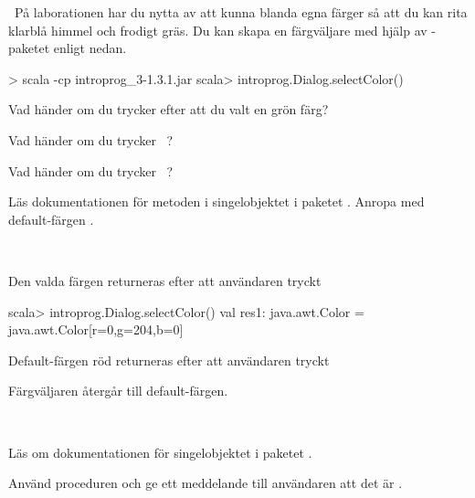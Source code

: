\Task \what~På laborationen har du nytta av att kunna blanda egna färger så att du kan rita klarblå himmel och frodigt gräs. Du kan skapa en färgväljare med hjälp av -paketet enligt nedan.
\begin{REPL}
> scala -cp introprog_3-1.3.1.jar
scala> introprog.Dialog.selectColor()
\end{REPL}

\Subtask Vad händer om du trycker  efter att du valt en grön färg?

\Subtask Vad händer om du trycker ~?

\Subtask Vad händer om du trycker ~?

\Subtask Läs  dokumentationen för metoden  i singelobjektet  i paketet . Anropa  med default-färgen .

\SOLUTION

\TaskSolved \what~

\Subtask Den valda färgen returneras efter att användaren tryckt 
\begin{REPL}
scala> introprog.Dialog.selectColor()
val res1: java.awt.Color = java.awt.Color[r=0,g=204,b=0]
\end{REPL}


\Subtask Default-färgen röd returneras efter att användaren tryckt 

\Subtask Färgväljaren återgår till default-färgen.

\QUESTEND




\QUESTBEGIN

\Task \what~

\Subtask Läs om dokumentationen för singelobjektet  i paketet .

\Subtask Använd proceduren  och ge ett meddelande till användaren att det är .

